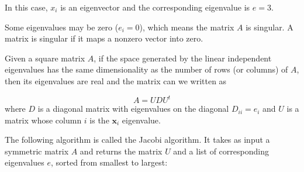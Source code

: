 \documentclass[justified, sixbynine]{tufte-book}
\theoremstyle{plain}%
\newtheorem * {corollary}{Corollary}
\theoremstyle{definition}
\theoremstyle{remark}
\newtheorem * {remark}{Remark}
\newtheorem * {note}{Note}
\begin{document}
\begin{fullwidth}
In this case, $x_i$ is an eigenvector and the corresponding eigenvalue is $e=3$.

Some eigenvalues may be zero ($e_i=0$), which means the matrix $A$ is singular. A matrix is singular if it maps a nonzero vector into zero.

Given a square matrix $A$, if the space generated by the linear independent eigenvalues has the same dimensionality as the number of rows (or columns) of $A$, then its eigenvalues are real and the matrix can we written as

\begin{equation}
A = U D U^t
\end{equation}
where
$D$ is a diagonal matrix with eigenvalues on the diagonal $D_{ii} = e_i$ and
$U$ is a matrix whose column $i$ is the $\mathbf{x}_i$ eigenvalue.

The following algorithm is called the Jacobi algorithm. It takes as input a symmetric matrix $A$ and returns the matrix $U$ and a list of corresponding eigenvalues $e$, sorted from smallest to largest:


\end{fullwidth}
\end{document}
